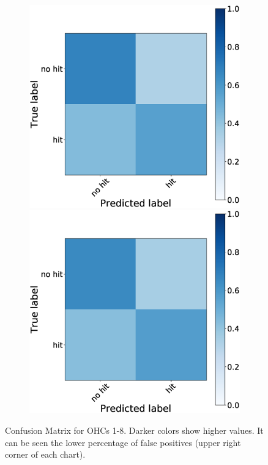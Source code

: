 \documentclass[journal]{IEEEtran}
\begin{document}
{{\begin{figure}[h!]
\begin{subfigure}{0.5\textwidth}
\includegraphics[scale=0.14]{revisedimages/matrix_7.eps}
\includegraphics[scale=0.14]{revisedimages/matrix_8.eps}\\
\end{subfigure}
\caption{Confusion Matrix for OHCs 1-8. Darker colors show higher values.  It can be seen the lower percentage of false positives (upper right corner of each chart).}
\label{fig:confusionmatrix}
\end{figure}

}}
\end{document}
